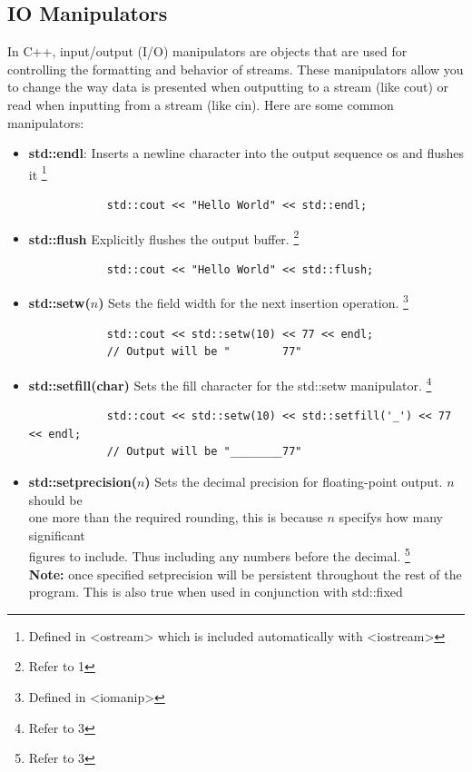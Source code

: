 \documentclass{report}
\begin{document}
    \subsection{IO Manipulators}
    \bigbreak \noindent 
    In C++, input/output (I/O) manipulators are objects that are used for controlling the formatting and behavior of streams. These manipulators allow you to change the way data is presented when outputting to a stream (like cout) or read when inputting from a stream (like cin).
    \bigbreak \noindent 
    Here are some common manipulators:
    \begin{itemize}
        \item \textbf{std::endl}:  Inserts a newline character into the output sequence os and flushes it \footnote{Defined in <ostream> which is included automatically with <iostream>}
            \smallbreak
            \sepline
            \begin{verbatim}
            std::cout << "Hello World" << std::endl;
            \end{verbatim}
            \sepline
        \item \textbf{std::flush}  Explicitly flushes the output buffer. \footnote{Refer to 1}
            \smallbreak
            \sepline
            \begin{verbatim}
            std::cout << "Hello World" << std::flush;
            \end{verbatim}
            \sepline
        \item \textbf{std::setw($n$)} Sets the field width for the next insertion operation. \footnote{Defined in <iomanip>}
            \smallbreak
            \sepline
            \begin{verbatim}
            std::cout << std::setw(10) << 77 << endl; 
            // Output will be "        77"
            \end{verbatim}
            \sepline
        \item \textbf{std::setfill(char)} Sets the fill character for the std::setw manipulator. \footnote{Refer to 3}
            \smallbreak
            \sepline
            \begin{verbatim}
            std::cout << std::setw(10) << std::setfill('_') << 77 << endl; 
            // Output will be "________77"
            \end{verbatim}
            \sepline

        \item \textbf{std::setprecision($n$)} Sets the decimal precision for floating-point output. $n$ should be  \\ one more than the required rounding, this is because $n$ specifys how many significant  \\ figures to include. Thus including any numbers before the decimal. \footnote{Refer to 3} \\
            \textbf{Note:} once specified setprecision will be persistent throughout the rest of the program. This is also true when used in conjunction with std::fixed


\end{itemize}
\end{document}
